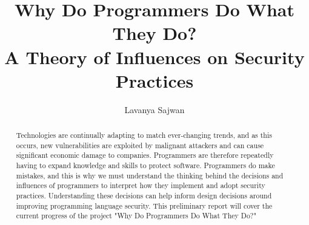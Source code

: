 \documentclass[11pt
              , a4paper
              , twoside
              , openright
              ]{report}
\title{Why Do Programmers Do What They Do? \protect\\ A Theory of Influences on Security Practices}
\author{Lavanya Sajwan}
\date{}
\begin{document}
\frontmatter



\begin{abstract}

Technologies are continually adapting to match ever-changing trends, and as this occurs, new vulnerabilities are exploited by malignant attackers and can cause significant economic damage to companies. Programmers are therefore repeatedly having to expand knowledge and skills to protect software. Programmers do make mistakes, and this is why we must understand the thinking behind the decisions and influences of programmers to interpret how they implement and adopt security practices. Understanding these decisions can help inform design decisions around improving programming language security. This preliminary report will cover the current progress of the project "Why Do Programmers Do What They Do?"

\end{abstract}


\maketitle



\tableofcontents



\mainmatter









\backmatter





\end{document}
